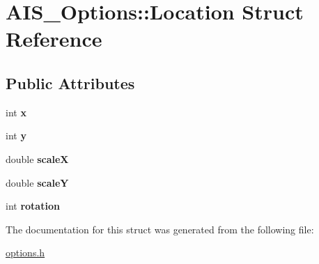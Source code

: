 \hypertarget{struct_a_i_s___options_1_1_location}{}\section{A\+I\+S\+\_\+\+Options\+:\+:Location Struct Reference}
\label{struct_a_i_s___options_1_1_location}
\subsection*{Public Attributes}
\begin{DoxyCompactItemize}
\item 
\hypertarget{struct_a_i_s___options_1_1_location_a924b78d8faca62b0f20d95033d4caf14}{}int {\bfseries x}\label{struct_a_i_s___options_1_1_location_a924b78d8faca62b0f20d95033d4caf14}

\item 
\hypertarget{struct_a_i_s___options_1_1_location_ae440db7ecbca694e7cd7bf38f6a643db}{}int {\bfseries y}\label{struct_a_i_s___options_1_1_location_ae440db7ecbca694e7cd7bf38f6a643db}

\item 
\hypertarget{struct_a_i_s___options_1_1_location_aa8912cf7ec3ecf0a0e60967ec7df125f}{}double {\bfseries scale\+X}\label{struct_a_i_s___options_1_1_location_aa8912cf7ec3ecf0a0e60967ec7df125f}

\item 
\hypertarget{struct_a_i_s___options_1_1_location_ab3d8de3e46148a2f12314e7813be90d4}{}double {\bfseries scale\+Y}\label{struct_a_i_s___options_1_1_location_ab3d8de3e46148a2f12314e7813be90d4}

\item 
\hypertarget{struct_a_i_s___options_1_1_location_a4c201c5c5889c22444a1bd47aaf927f3}{}int {\bfseries rotation}\label{struct_a_i_s___options_1_1_location_a4c201c5c5889c22444a1bd47aaf927f3}

\end{DoxyCompactItemize}


The documentation for this struct was generated from the following file\+:\begin{DoxyCompactItemize}
\item 
\hyperlink{options_8h}{options.\+h}\end{DoxyCompactItemize}
